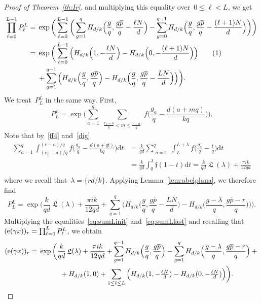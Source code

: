 \documentclass[11pt]{amsart}
\newcommand{\lf}{{\mathfrak f}}
\theoremstyle{definition}
\newcommand{\ssum}[1]{\sum_{\substack{#1}}}
\newcommand{\pr}[1]{\mathchoice{\left( #1\right)}{(#1)}{(#1)}{(#1)}}
\newcommand{\e}[1][]{\ifthenelse{\equal{#1}{}}{{\rm e}}{\operatorname{e}\pr{ #1}}}
\newcommand{\df}{\mathrm{d}}
\DeclareMathOperator{\Lie}{{\mathfrak L}}
\newcommand{\1}{{\mathbf 1}}
\renewcommand{\bar}[1]{\overline{#1}}
\newcommand\numberthis{\stepcounter{equation}\tag{\theequation}}
\let\originalleft\left
\let\originalright\right
\renewcommand{\left}{\mathopen{}\mathclose\bgroup\originalleft}
\renewcommand{\right}{\aftergroup\egroup\originalright}
\numberwithin{equation}{section}
\begin{document}
\begin{proof}[Proof of Theorem~\ref{th:Ir}]
  and multiplying this equality over~$0\leq \ell <L$, we get
  \begin{align*}
    \prod_{\ell =0}^{L-1} P_\ell ^L ={}&\exp\bigg( \sum_{\ell =0}^{L-1}\bigg(\sum_{g=1}^{q} H_{d/k}\Big(\frac {g}q, \frac{g\overline p}q - \frac{\ell N}d\Big) - \sum_{g=0}^{q-1} H_{d/k}\Big(\frac {g}q, \frac{g\overline p}q - \frac{(\ell +1)N}d\Big) \bigg)\bigg) \\
    ={}& \exp\bigg(\sum_{\ell =0}^{L-1} \Big(H_{d/k}\Big(1, -\frac{\ell N}d\Big) - H_{d/k}\Big(0, -\frac{(\ell +1)N}d\Big)\Big) \numberthis\label{eq:sumLinit}\\
    & + \sum_{g=1}^{q-1} \Big( H_{d/k}\Big(\frac gq, \frac{g\bar{p}}q\Big) - H_{d/k}\Big(\frac gq, \frac{g\bar{p}}q - \frac{LN}d\Big) \Big)\bigg). 
  \end{align*}
  We treat~$P_L^L$ in the same way. First,
  $$
  P_L^L 
  ={}\exp\bigg( \sum_{a=1}^{q}\ssum{\frac{r_L -a}q < m \leq \frac{r-a}q} f\Big(\frac{g_a}q - \frac{d(a+mq)}{kq}\Big)\bigg). 
  $$
  Note that by~\eqref{ff4} and~\eqref{dig}
  \begin{align*}
    \sum_{a=1}^{q} \int_{(r_L -a)/q}^{(r-a)/q} f\Big(\frac{g_a}q - \frac{d(a+qt)}{kq}\Big)\df t  &= \frac k{qd} \ssum{a=1}^{q} \int_L ^{L+\lambda} f\Big(\frac{g_a}q-\frac{t}q\Big)\df t \\
    &=\frac k{qd}  \int_{0}^\lambda \lf(1-t)\df t= \frac k{qd}  \Lie(\lambda)+\frac{\pi i k }{12 qd}\\
  \end{align*}
  where we recall that~$\lambda = \{rd/k\}$. Applying Lemma~\ref{lem:abelplana}, we therefore find
  \begin{equation}\label{eq:sumLlast}
    P_L^L = \exp\bigg(\frac k{qd}  \Lie(\lambda)+\frac{\pi i k }{12 qd} + \sum_{g=1}^{q} \Big(H_{d/k}\Big(\frac gq, \frac{g\bar{p}}q-\frac{LN}d\Big) - H_{d/k}\Big(\frac{g-\lambda}q, \frac{g\bar{p}-r}q\Big)\Big)\bigg).
  \end{equation}
  Multiplying the equalities~\eqref{eq:sumLinit} and~\eqref{eq:sumLlast} and recalling that $(\e[\gamma x])_r = \prod_{\ell =0}^L P_\ell^L$, we obtain
  \begin{align*}
    (\e[\gamma x])_r
    ={}& \exp\bigg(\frac k{qd}  \Lie(\lambda)+\frac{\pi i k }{12 qd} + \sum_{g=1}^{q-1} H_{d/k}\Big(\frac gq, \frac{g\bar{p}}q\Big) - \sum_{g=1}^q H_{d/k}\Big(\frac{g-\lambda}q, \frac{g\bar{p}-r}q\Big) +{} \\
    {}& \hspace{3em} + H_{d/k}(1, 0)+ \sum_{1\leq \ell  \leq L} \Big(H_{d/k}(1, -\tfrac{\ell N}d) - H_{d/k}(0, -\tfrac{\ell N}d)\Big)\bigg) .

\end{align*}
\end{proof}
\end{document}
